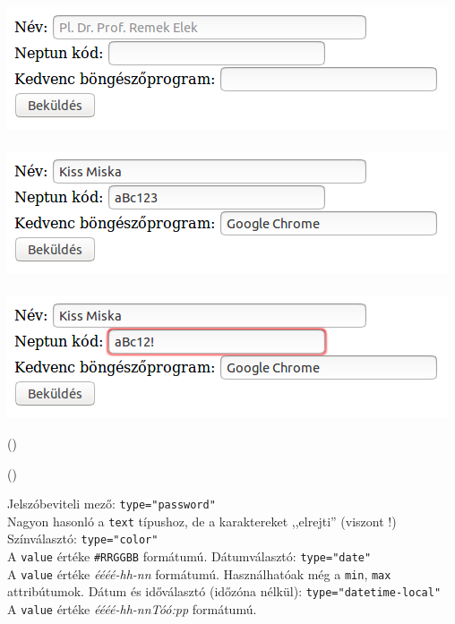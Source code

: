 \begin{frame}
  \begin{center}
    \includegraphics[width=.5\textwidth]{urlap2-1.png}\\\vspace{-.5cm}\hrulefill\\
    \includegraphics[width=.5\textwidth]{urlap2-2.png}\\\vspace{-.5cm}\hrulefill\\
    \includegraphics[width=.5\textwidth]{urlap2-3.png}\\
  \end{center}
\end{frame}

\begin{frame}
  \begin{exampleblock}{ ()}
    \footnotesize
    
  \end{exampleblock}
\end{frame}

\begin{frame}
  \begin{exampleblock}{ ()}
    \footnotesize
    
  \end{exampleblock}
\end{frame}

\begin{frame}
  Jelszóbeviteli mező: \texttt{type="password"}\\
  Nagyon hasonló a \texttt{text} típushoz, de a karaktereket ,,elrejti'' (viszont !)
  \vfill
  Színválasztó: \texttt{type="color"}\\
  A \texttt{value} értéke \texttt{\#RRGGBB} formátumú.
  \vfill
  Dátumválasztó: \texttt{type="date"}\\
  A \texttt{value} értéke \emph{éééé-hh-nn} formátumú. Használhatóak még a \texttt{min}, \texttt{max} attribútumok.
  \vfill
  Dátum és időválasztó (időzóna nélkül):  \texttt{type="datetime-local"}\\
  A \texttt{value} értéke \emph{éééé-hh-nnTóó:pp} formátumú.
\end{frame}

